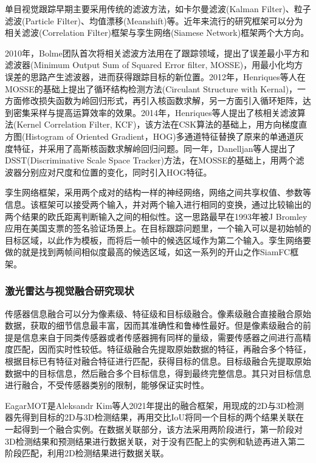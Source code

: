 单目视觉跟踪早期主要采用传统的滤波方法，如卡尔曼滤波(Kalman Filter)、粒子滤波(Particle Filter)、均值漂移(Meanshift)等。近年来流行的研究框架可以分为相关滤波(Correlation Filter)框架与孪生网络(Siamese Network)框架两个大方向。

2010年，Bolme团队首次将相关滤波方法用在了跟踪领域，提出了误差最小平方和滤波器(Minimum Output Sum of Squared Error filter, MOSSE)\cite{bolme2010visual}，用最小化均方误差的思路产生滤波器，进而获得跟踪目标的新位置。2012年，Henriques等人在MOSSE的基础上提出了循环结构检测方法(Circulant Structure with Kernal)\cite{henriques2012exploiting}，一方面修改损失函数为岭回归形式，再引入核函数求解，另一方面引入循环矩阵，达到密集采样与提高运算效率的效果。2014年，Henriques等人提出了核相关滤波算法(Kernel Correlation Filter, KCF)\cite{henriques2014high}，该方法在CSK算法的基础上，用方向梯度直方图(Histogram of Oriented Gradient，HOG)多通道特征替换了原来的单通道灰度特征，并采用了高斯核函数求解岭回归问题。同一年，Danelljan等人提出了DSST(Discriminative Scale Space Tracker)\cite{danelljan2015convolutional}方法，在MOSSE的基础上，用两个滤波器分别应对尺度和位置的变化，同时引入HOG特征。

孪生网络框架，采用两个成对的结构一样的神经网络，网络之间共享权值、参数等信息。该框架可以接受两个输入，并对两个输入进行相同的变换，通过比较输出的两个结果的欧氏距离判断输入之间的相似性。这一思路最早在1993年被J Bromley应用在美国支票的签名验证场景上\cite{bromley1993signature}。在目标跟踪问题里，一个输入可以是初始帧的目标区域，以此作为模板，而将后一帧中的候选区域作为第二个输入。孪生网络要做的就是找到两帧间相似度最高的候选区域，如这一系列的开山之作SiamFC框架\cite{bertinetto2016fully}。

\subsubsection{激光雷达与视觉融合研究现状}

传感器信息融合可以分为像素级、特征级和目标级融合\cite{wang2020jiyusanweileida}。像素级融合直接融合原始数据，获取的细节信息最丰富，因而其准确性和鲁棒性最好。但是像素级融合的前提是信息来自于同类传感器或者传感器拥有同样的量级，需要传感器之间进行高精度匹配，因而实时性较低。特征级融合先提取原始数据的特征，再融合多个特征，根据目标已有特征对融合特征进行匹配，获得目标的信息。目标级融合先提取原始数据中的目标信息，然后融合多个目标信息，得到最终完整信息。其只对目标信息进行融合，不受传感器类别的限制，能够保证实时性。

EagarMOT是Aleksandr Kim等人2021年提出的融合框架\cite{kim2021eagermot}，用现成的2D与3D检测器先得到目标的2D与3D检测结果，再用交比IoU将同一个目标的两个结果关联在一起得到一个融合实例。在数据关联部分，该方法采用两阶段进行，第一阶段对3D检测结果和预测结果进行数据关联，对于没有匹配上的实例和轨迹再进入第二阶段匹配，利用2D检测结果进行数据关联。

